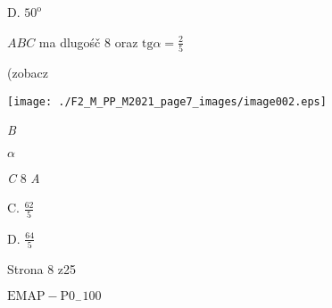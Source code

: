 \documentclass[a4paper,12pt]{article}
\begin{document}
D. $50^{\mathrm{o}}$

$ABC$ ma dlugośč 8 oraz $\displaystyle \mathrm{t}\mathrm{g}\alpha=\frac{2}{5}$

(zobacz
\begin{center}
\texttt{[image: ./F2\_M\_PP\_M2021\_page7\_images/image002.eps]}
\end{center}
{\it B}

$\alpha$

{\it C} 8  {\it A}

C. $\displaystyle \frac{62}{5}$

D. $\displaystyle \frac{64}{5}$

Strona 8 z25

$\mathrm{E}\mathrm{M}\mathrm{A}\mathrm{P}-\mathrm{P}0_{-}100$
\end{document}
